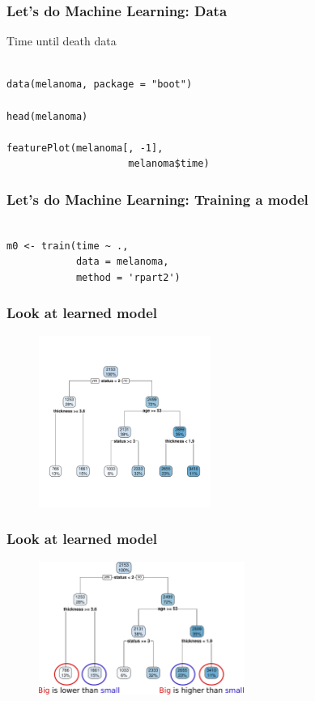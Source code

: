 \documentclass[handout, aspectratio = 169]{beamer}
\begin{document}
\begin{frame}[fragile]
\frametitle{Let's do Machine Learning: Data}
Time until death data
\begin{Verbatim}

data(melanoma, package = "boot")

head(melanoma)

featurePlot(melanoma[, -1], 
                     melanoma$time)

\end{Verbatim}

\end{frame} 

\begin{frame}[fragile]
\frametitle{ Let's do Machine Learning: Training a model}
\begin{Verbatim}

m0 <- train(time ~ ., 
            data = melanoma,
            method = 'rpart2')

\end{Verbatim}

\end{frame} 

\begin{frame}
\frametitle{Look at learned model}
\vspace{-4mm}
\begin{figure}
    \includegraphics[width = 0.5\textwidth]{rpart_tree.pdf}
\end{figure} 

\end{frame} 



\begin{frame}
\frametitle{Look at learned model}
\vspace{2mm}
\begin{figure}
    \includegraphics[width = 0.6\textwidth]{rpart_annotate.pdf}
\end{figure} 

\end{frame} 
\end{document}
